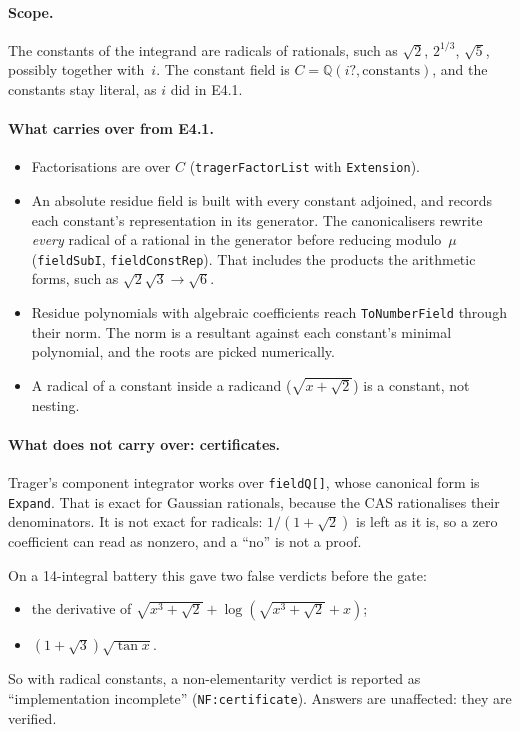\documentclass[11pt]{article}
\theoremstyle{definition}
\theoremstyle{remark}
\newcommand{\Q}{\mathbb{Q}}
\newcommand{\code}[1]{\texttt{#1}}
\begin{document}
\paragraph{Scope.} The constants of the integrand are radicals of rationals,
such as $\sqrt2$, $2^{1/3}$, $\sqrt5$, possibly together with~$i$. The constant
field is $C=\Q(i?,\text{constants})$, and the constants stay literal, as $i$
did in E4.1.

\paragraph{What carries over from E4.1.}
\begin{itemize}
\item Factorisations are over $C$ (\code{tragerFactorList} with
  \code{Extension}).
\item An absolute residue field is built with every constant adjoined, and
  records each constant's representation in its generator. The canonicalisers
  rewrite \emph{every} radical of a rational in the generator before reducing
  modulo~$\mu$ (\code{fieldSubI}, \code{fieldConstRep}). That includes the
  products the arithmetic forms, such as $\sqrt2\sqrt3\to\sqrt6$.
\item Residue polynomials with algebraic coefficients reach
  \code{ToNumberField} through their norm. The norm is a resultant against each
  constant's minimal polynomial, and the roots are picked numerically.
\item A radical of a constant inside a radicand ($\sqrt{x+\sqrt2}$) is a
  constant, not nesting.
\end{itemize}

\paragraph{What does not carry over: certificates.} Trager's component
integrator works over \code{fieldQ[]}, whose canonical form is
\code{Expand}. That is exact for Gaussian rationals, because the CAS
rationalises their denominators. It is not exact for radicals:
$1/(1+\sqrt2)$ is left as it is, so a zero coefficient can read as nonzero, and
a ``no'' is not a proof.

On a 14-integral battery this gave two false verdicts before the gate:
\begin{itemize}
\item the derivative of $\sqrt{x^3+\sqrt2}+\log(\sqrt{x^3+\sqrt2}+x)$;
\item $(1+\sqrt3)\sqrt{\tan x}$.
\end{itemize}
So with radical constants, a non-elementarity verdict is reported as
``implementation incomplete'' (\code{NF:certificate}). Answers are unaffected:
they are verified.
\end{document}
